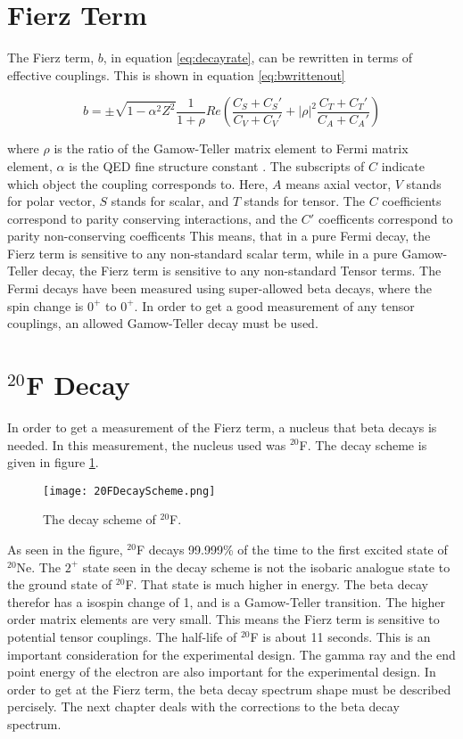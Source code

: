 \documentclass[main.tex]{subfiles}
\begin{document}
\section{Fierz Term}
The Fierz term, $b$, in equation \ref{eq:decayrate}, can be rewritten in terms of effective couplings.
This is shown in equation \ref{eq:bwrittenout}

\begin{equation}
	b =  \pm \sqrt{1 - \alpha^{2}{Z^{2}}}\frac{1}{1 + \rho}Re(\frac{C_{S} + C_{S}'}{C_{V} + C_{V}'} + |\rho|^{2}\frac{C_{T} + C_{T}'}{C_{A} + C_{A}'})
	\label{eq:bwrittenout}
\end{equation}

where $\rho$ is the ratio of the Gamow-Teller matrix element to Fermi matrix element, $\alpha$ is the QED fine structure constant \cite{OSCARPAPER}. 
The subscripts of $C$ indicate which object the coupling corresponds to. 
Here, $A$ means axial vector, $V$ stands for polar vector, $S$ stands for scalar, and $T$ stands for tensor. 
The $C$ coefficients correspond to parity conserving interactions, and the $C'$ coefficents correspond to parity non-conserving coefficents \cite{Lee56}
This means, that in a pure Fermi decay, the Fierz term is sensitive to any non-standard scalar term, while in a pure Gamow-Teller decay, the Fierz term is sensitive to any non-standard Tensor terms. 
The Fermi decays have been measured using super-allowed beta decays, where the spin change is $0^{+}$ to $0^{+}$. 
In order to get a good measurement of any tensor couplings, an allowed Gamow-Teller decay must be used. 

\section{$^{20}$F Decay}
In order to get a measurement of the Fierz term, a nucleus that beta decays is needed.
In this measurement, the nucleus used was $^{20}$F.
The decay scheme is given in figure \ref{fig:DecayScheme}.

\begin{figure}[!htb]
	\centerline{\texttt{[image: 20FDecayScheme.png]}}
	\caption{The decay scheme of $^{20}$F.}
	\label{fig:DecayScheme}
\end{figure}

As seen in the figure, $^{20}$F decays 99.999\% of the time to the first excited state of $^{20}$Ne.
The $2^{+}$ state seen in the decay scheme is not the isobaric analogue state to the ground state of $^{20}$F.
That state is much higher in energy.
The beta decay therefor has a isospin change of 1, and is a Gamow-Teller transition.
The higher order matrix elements are very small.
This means the Fierz term is sensitive to potential tensor couplings.
The half-life of $^{20}$F is about 11 seconds. 
This is an important consideration for the experimental design.
The gamma ray and the end point energy of the electron are also important for the experimental design.
In order to get at the Fierz term, the beta decay spectrum shape must be described percisely.
The next chapter deals with the corrections to the beta decay spectrum.  
\end{document}
